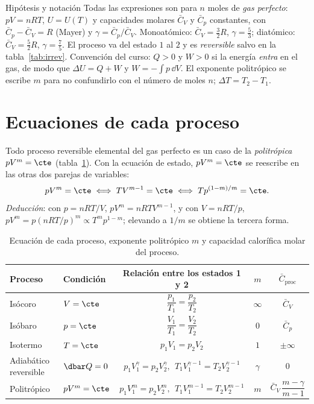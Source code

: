 \documentclass[11pt,a4paper]{article}
\newcommand{\Cv}{\bar C_V}
\newcommand{\Cp}{\bar C_p}
\begin{document}
\vspace{0.2cm}
\begin{recuadro}{Hipótesis y notación}
Todas las expresiones son para $n$ moles de \emph{gas perfecto}: $pV=nRT$, $U=U(T)$ y capacidades molares
$\Cv$ y $\Cp$ constantes, con $\Cp-\Cv=R$ (Mayer) y $\gamma=\Cp/\Cv$. Monoatómico: $\Cv=\tfrac32R$,
$\gamma=\tfrac53$; diatómico: $\Cv=\tfrac52R$, $\gamma=\tfrac75$. El proceso va del estado $1$ al $2$ y es
\emph{reversible} salvo en la tabla~\ref{tab:irrev}. Convención del curso: $Q>0$ y $W>0$ si la energía
\emph{entra} en el gas, de modo que $\Delta U=Q+W$ y $W=-\int p\,\dd V$. El exponente politrópico se
escribe $m$ para no confundirlo con el número de moles $n$; $\Delta T=T_2-T_1$.
\end{recuadro}

\section{Ecuaciones de cada proceso}

Todo proceso reversible elemental del gas perfecto es un caso de la \emph{politrópica} $pV^m=\cte$
(tabla~\ref{tab:ecuaciones}). Con la ecuación de estado, $pV^m=\cte$ se reescribe en las otras dos parejas de
variables:
\begin{equation}\label{eq:politropica}
  pV^m=\cte\iff TV^{m-1}=\cte\iff Tp^{(1-m)/m}=\cte .
\end{equation}
\emph{Deducción}: con $p=nRT/V$, $pV^m=nRTV^{m-1}$, y con $V=nRT/p$, $pV^m=p(nRT/p)^m\propto T^mp^{1-m}$;
elevando a $1/m$ se obtiene la tercera forma.

\begin{table}[htbp]
\centering
\caption{Ecuación de cada proceso, exponente politrópico $m$ y capacidad calorífica molar del proceso.}
\label{tab:ecuaciones}
\small
\renewcommand{\arraystretch}{1.75}
\begin{tabular}{llccc}
\toprule
Proceso & Condición & Relación entre los estados 1 y 2 & $m$ & $\bar C_{\mathrm{proc}}$\\
\midrule
Isócoro & $V=\cte$ & $\dfrac{p_1}{T_1}=\dfrac{p_2}{T_2}$ & $\infty$ & $\Cv$\\
Isóbaro & $p=\cte$ & $\dfrac{V_1}{T_1}=\dfrac{V_2}{T_2}$ & $0$ & $\Cp$\\
Isotermo & $T=\cte$ & $p_1V_1=p_2V_2$ & $1$ & $\pm\infty$\\
Adiabático reversible & $\dbar Q=0$ & $p_1V_1^{\gamma}=p_2V_2^{\gamma},\ \ T_1V_1^{\gamma-1}=T_2V_2^{\gamma-1}$ & $\gamma$ & $0$\\
Politrópico & $pV^m=\cte$ & $p_1V_1^{m}=p_2V_2^{m},\ \ T_1V_1^{m-1}=T_2V_2^{m-1}$ & $m$ & $\Cv\,\dfrac{m-\gamma}{m-1}$\\
\bottomrule
\end{tabular}
\end{table}
\end{document}
